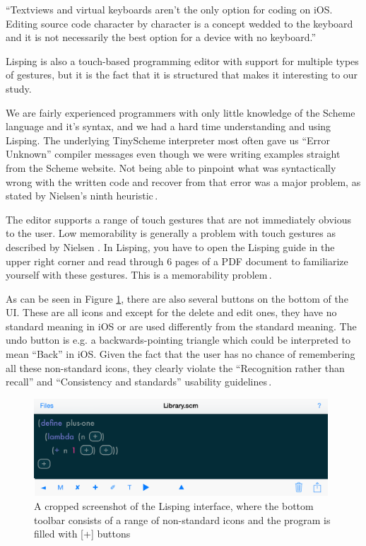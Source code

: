 ``Textviews and virtual keyboards aren't the only option for coding on iOS. Editing source code character by character is a concept wedded to the keyboard and it is not necessarily the best option for a device with no keyboard.''

Lisping is also a touch-based programming editor with support for multiple types of gestures, but it is the fact that it is structured that makes it interesting to our study.

We are fairly experienced programmers with only little knowledge of the Scheme language and it's syntax, and we had a hard time understanding and using Lisping. The underlying TinyScheme interpreter most often gave us “Error Unknown” compiler messages even though we were writing examples straight from the Scheme website. Not being able to pinpoint what was syntactically wrong with the written code and recover from that error was a major problem, as stated by Nielsen's ninth heuristic\,\cite{nielsen1990heuristic}.

The editor supports a range of touch gestures that are not immediately obvious to the user. Low memorability is generally a problem with touch gestures as described by Nielsen \cite[p. 141]{nielsen2013mobile}. In Lisping, you have to open the Lisping guide in the upper right corner and read through 6 pages of a PDF document to familiarize yourself with these gestures. This is a memorability problem\,\cite{nielsen1990heuristic}.

As can be seen in Figure \ref{fig:Lisping_screenshot}, there are also several buttons on the bottom of the UI. These are all icons and except for the delete and edit ones, they have no standard meaning in iOS or are used differently from the standard meaning. The undo button is e.g. a backwards-pointing triangle which could be interpreted to mean “Back” in iOS. Given the fact that the user has no chance of remembering all these non-standard icons, they clearly violate the ``Recognition rather than recall'' and ``Consistency and standards'' usability guidelines\,\cite{nielsen1990heuristic}. 

\begin{figure}
	\centering
		\includegraphics[width=110mm]{diagrams/Lisping_screenshot.png}
	\caption{A cropped screenshot of the Lisping interface, where the bottom
	toolbar consists of a range of non-standard icons and the program is filled
	with [+] buttons}
\label{fig:Lisping_screenshot}
\end{figure}

